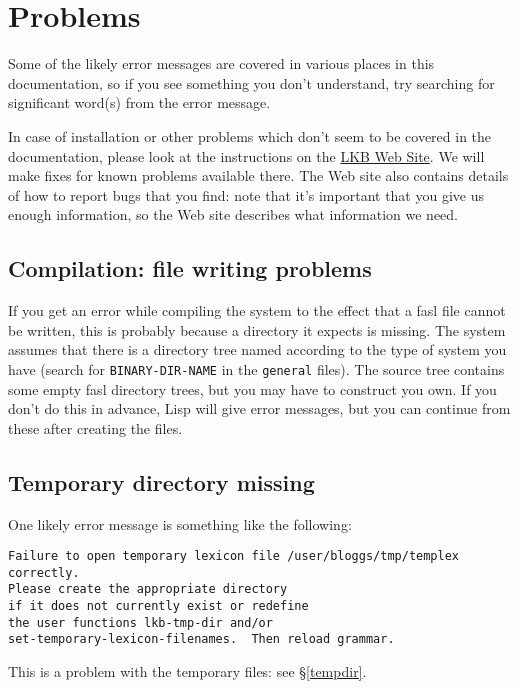 \documentclass[12pt]{report}
\begin{document}
\section{Problems}

Some of the likely error messages are covered in various places in this
documentation, so if you see something you don't understand, try searching for
significant word(s) from the error message.

In case of installation or other problems which don't seem to be covered in the
documentation, please look at the instructions on the
\href{http://www-csli.stanford.edu/~aac/lkb.html}{LKB Web Site}.  We will make
fixes for known problems available there.  The Web site also contains details
of how to report bugs that you find: note that it's important that you give us
enough information, so the Web site describes what information we need.

\subsection{Compilation: file writing problems}

If you get an error while compiling the system to the effect that
a fasl file cannot be written, this is probably because a directory it
expects is missing.
The system assumes that there
is a directory tree named according to the type of system you have
(search for {\tt BINARY-DIR-NAME} in the {\tt general} files).
The source tree contains some empty fasl directory trees, but you
may have to construct you own.
If you don't do this in advance, Lisp will give error messages, but
you can continue from these after creating the files.


\subsection{Temporary directory missing}

One likely error message is something like the following:
\begin{verbatim}
Failure to open temporary lexicon file /user/bloggs/tmp/templex correctly.
Please create the appropriate directory 
if it does not currently exist or redefine
the user functions lkb-tmp-dir and/or
set-temporary-lexicon-filenames.  Then reload grammar.
\end{verbatim}
This is a problem with the temporary files: see \S\ref{tempdir}.
\end{document}
